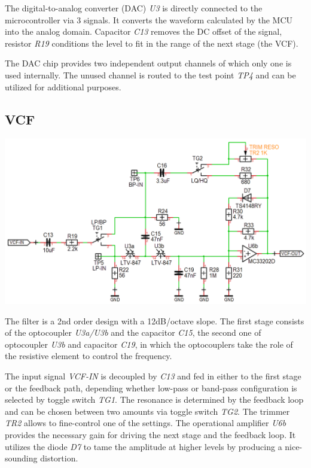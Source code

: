 \documentclass{scrartcl}
\begin{document}
The digital-to-analog converter (DAC) \emph{U3} is directly connected to the microcontroller via 3 signals. It converts the waveform calculated by the MCU into the analog domain. Capacitor \emph{C13} removes the DC offset of the signal, resistor \emph{R19} conditions the level to fit in the range of the next stage (the VCF).

The DAC chip provides two independent output channels of which only one is used internally. The unused channel is routed to the test point \emph{TP4} and can be utilized for additional purposes.

\subsection{VCF}

\begin{center}
    \includegraphics[scale=0.39]{assets/schema-vcf.png}
\end{center}

The filter is a 2nd order design with a 12dB/octave slope. The first stage consists of the optocoupler \emph{U3a/U3b} and the capacitor \emph{C15}, the second one of optocoupler \emph{U3b} and capacitor \emph{C19}, in which the optocouplers take the role of the resistive element to control the frequency.

The input signal \emph{VCF-IN} is decoupled by \emph{C13} and fed in either to the first stage or the feedback path, depending whether low-pass or band-pass configuration is selected by toggle switch \emph{TG1}. The resonance is determined by the feedback loop and can be chosen between two amounts via toggle switch \emph{TG2}. The trimmer \emph{TR2} allows to fine-control one of the settings. The operational amplifier \emph{U6b} provides the necessary gain for driving the next stage and the feedback loop. It utilizes the diode \emph{D7} to tame the amplitude at higher levels by producing a nice-sounding distortion.
\end{document}
